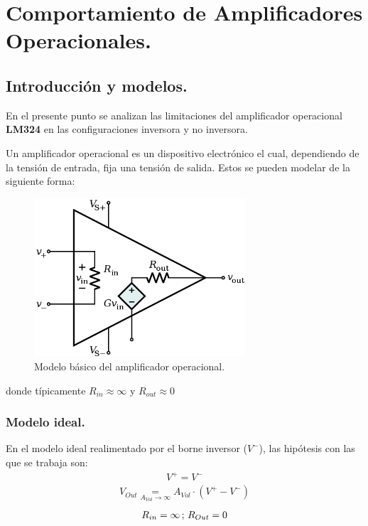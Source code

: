 

\newcommand\underrel[2]{\mathrel{\mathop{#2}\limits_{#1}}}

\usepackage{circuitikz}
\usepackage{xcolor}
\usepackage{amsmath}




\section{Comportamiento de Amplificadores Operacionales.}

\subsection{Introducción y modelos.}
En el presente punto se analizan las limitaciones del amplificador operacional \textbf{LM324} en las configuraciones inversora y no inversora.

Un amplificador operacional es un dispositivo electrónico el cual, dependiendo de la tensión de entrada, fija una tensión de salida. Estos se pueden modelar de la siguiente forma:
\begin{figure}[H]	
	\centering
	\includegraphics[width=0.7\textwidth]{Ejercicio1/Imagenes/Basicopamp.png}
	\caption{Modelo básico del amplificador operacional.}
	\label{fig:Basicopamp}
\end{figure}
donde típicamente $R_{in}\approx \infty$ y $R_{out} \approx 0$

\subsubsection{Modelo ideal.}
En el modelo ideal realimentado por el borne inversor ($V^-$), las hipótesis con las que se trabaja son:
\begin{align} V^+ = V^- \end{align}
\begin{align}V_{Out} \underrel{A_{Vol}\to \infty}{=} A_{Vol} \cdot (V^+ - V^-) \end{align}
\begin{align} R_{in}=\infty   \thinspace;\thinspace R_{Out} = 0 \end{align}


